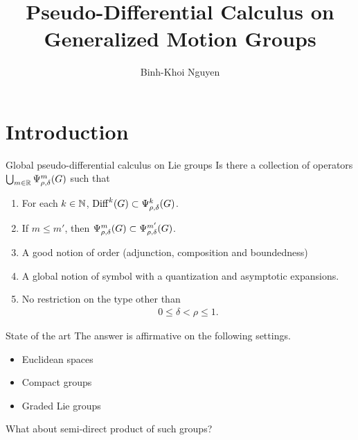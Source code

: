 \documentclass{beamer}
\title{Pseudo-Differential Calculus on Generalized Motion Groups}
\author{Binh-Khoi Nguyen}
\begin{document}
\maketitle

\section{Introduction}

\begin{frame}{Global pseudo-differential calculus on Lie groups}
    Is there a collection of operators $\bigcup_{m \in \mathbb{R}} \Psi^{m}_{\rho, \delta}(G)$ such that
    \begin{enumerate}
        \item
            For each $k \in \mathbb{N}$,
            $\mathrm{Diff}^k(G) \subset \Psi^{k}_{\rho, \delta}(G)$.
            \pause
        \item
            If $m \leq m'$,
            then $\Psi^{m}_{\rho, \delta}(G) \subset \Psi^{m'}_{\rho, \delta}(G)$.
            \pause
        \item
            A good notion of order (adjunction, composition and boundedness)
            \pause
        \item
            A global notion of symbol with a quantization and asymptotic expansions.
            \pause
        \item
            No restriction on the type other than
            \begin{align*}
                0 \leq \delta < \rho \leq 1.
            \end{align*}
    \end{enumerate}
\end{frame}

\begin{frame}{State of the art}
    The answer is affirmative on the following settings.

    \begin{itemize}
        \item Euclidean spaces
            \pause
        \item Compact groups \cite{RuzhanskyTurunen10}
            \pause
        \item Graded Lie groups \cite{FischerRuzhansky16}
            \pause
    \end{itemize}

    What about semi-direct product of such groups?
\end{frame}
\end{document}
